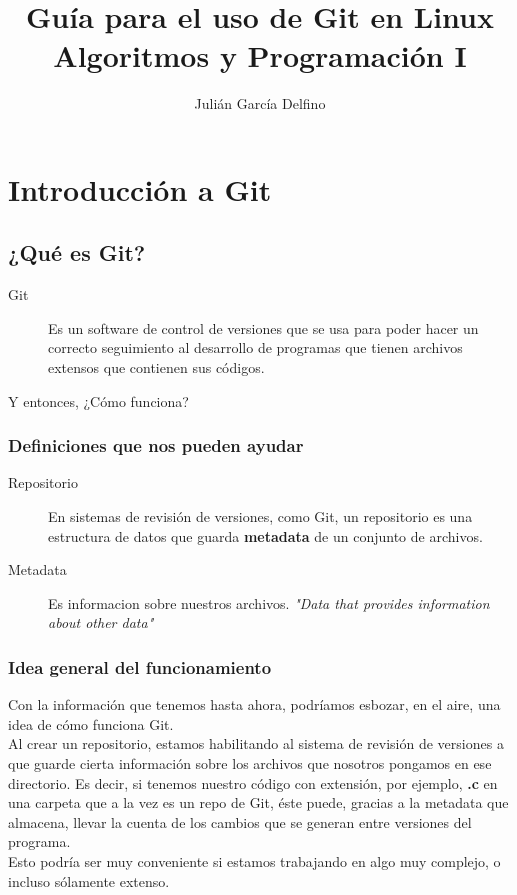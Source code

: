 \documentclass[a4paper, 12pt]{article}
\begin{document}
\setlength{\parindent}{0pt}

\title{Guía para el uso de Git en Linux\\
\large Algoritmos y Programación I}
\author{Julián García Delfino}
\maketitle
\newpage
	  
\tableofcontents
\newpage

\section{Introducción a Git}

\subsection{¿Qué es Git?}

\begin{description}
\item[Git] Es un software de control de versiones que se usa para poder hacer un correcto seguimiento al desarrollo de programas que tienen archivos extensos que contienen sus códigos.
\end{description}

Y entonces, ¿Cómo funciona?

\subsubsection{Definiciones que nos pueden ayudar}

\begin{description}
\item[Repositorio] En sistemas de revisión de versiones, como Git, un repositorio es una estructura de datos que guarda \textbf{metadata} de un conjunto de archivos.
\item[Metadata] Es informacion sobre nuestros archivos. \textit{"Data that provides information about other data"}
\end{description}

\subsubsection{Idea general del funcionamiento}

Con la información que tenemos hasta ahora, podríamos esbozar, en el aire, una idea de cómo funciona Git.\\
Al crear un repositorio, estamos habilitando al sistema de revisión de versiones a que guarde cierta información sobre los archivos que nosotros pongamos en ese directorio. Es decir, si tenemos nuestro código con extensión, por ejemplo, \textbf{.c} en una carpeta que a la vez es un repo de Git, éste puede, gracias a la metadata que almacena, llevar la cuenta de los cambios que se generan entre versiones del programa.\\
Esto podría ser muy conveniente si estamos trabajando en algo muy complejo, o incluso sólamente extenso.
\end{document}
